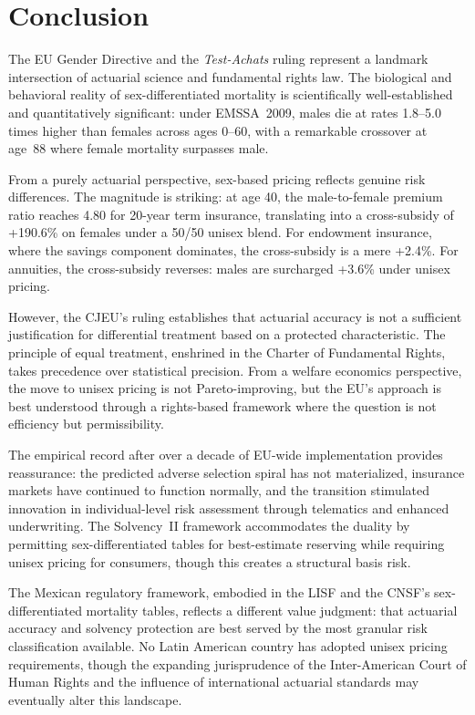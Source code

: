 \documentclass[12pt,a4paper]{article}
\begin{document}
\section{Conclusion}
\label{sec:conclusion}

The EU Gender Directive and the \emph{Test-Achats} ruling represent a landmark
intersection of actuarial science and fundamental rights law. The biological and
behavioral reality of sex-differentiated mortality is scientifically well-established
and quantitatively significant: under EMSSA~2009, males die at rates 1.8--5.0
times higher than females across ages 0--60, with a remarkable crossover at age~88
where female mortality surpasses male.

From a purely actuarial perspective, sex-based pricing reflects genuine risk
differences. The magnitude is striking: at age 40, the male-to-female premium
ratio reaches 4.80 for 20-year term insurance, translating into a cross-subsidy
of +190.6\% on females under a 50/50 unisex blend. For endowment insurance,
where the savings component dominates, the cross-subsidy is a mere +2.4\%.
For annuities, the cross-subsidy reverses: males are surcharged +3.6\% under
unisex pricing.

However, the CJEU's ruling establishes that actuarial accuracy is not a sufficient
justification for differential treatment based on a protected characteristic. The
principle of equal treatment, enshrined in the Charter of Fundamental Rights, takes
precedence over statistical precision. From a welfare economics perspective, the
move to unisex pricing is not Pareto-improving, but the EU's approach is best
understood through a rights-based framework where the question is not efficiency
but permissibility.

The empirical record after over a decade of EU-wide implementation provides
reassurance: the predicted adverse selection spiral has not materialized, insurance
markets have continued to function normally, and the transition stimulated
innovation in individual-level risk assessment through telematics and enhanced
underwriting. The Solvency~II framework accommodates the duality by permitting
sex-differentiated tables for best-estimate reserving while requiring unisex pricing
for consumers, though this creates a structural basis risk.

The Mexican regulatory framework, embodied in the LISF and the CNSF's sex-differentiated
mortality tables, reflects a different value judgment: that actuarial accuracy and
solvency protection are best served by the most granular risk classification
available. No Latin American country has adopted unisex pricing requirements,
though the expanding jurisprudence of the Inter-American Court of Human Rights
and the influence of international actuarial standards may eventually alter
this landscape.
\end{document}
